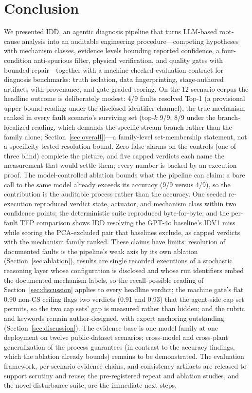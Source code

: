\documentclass[preprint,12pt]{elsarticle}
\begin{document}
\section{Conclusion}
\label{sec:conclusion}

We presented IDD, an agentic diagnosis pipeline that turns LLM-based root-cause analysis into an auditable engineering procedure---competing hypotheses with mechanism classes, evidence levels bounding reported confidence, a four-condition anti-spurious filter, physical verification, and quality gates with bounded repair---together with a machine-checked evaluation contract for diagnosis benchmarks: truth isolation, data fingerprinting, stage-authored artifacts with provenance, and gate-graded scoring. On the 12-scenario corpus the headline outcome is deliberately modest: 4/9 faults resolved Top-1 (a provisional upper-bound reading under the disclosed identifier channel), the true mechanism ranked in every fault scenario's surviving set (top-$k$ 9/9; 8/9 under the branch-localized reading, which demands the specific stream branch rather than the family alone; Section~\ref{sec:overall})---a family-level set-membership statement, not a specificity-tested resolution bound. Zero false alarms on the controls (one of three blind) complete the picture, and five capped verdicts each name the measurement that would settle them; every number is backed by an execution proof. The model-controlled ablation bounds what the pipeline can claim: a bare call to the same model already exceeds its accuracy (9/9 versus 4/9), so the contribution is the auditable process rather than the accuracy. One seeded re-execution reproduced verdict state, actuator, and mechanism class within two confidence points; the deterministic suite reproduced byte-for-byte; and the per-fault TEP comparison shows IDD resolving the GPT-4o baseline's IDV1 miss while scoring the PCA-excluded pair that baselines exclude, as capped verdicts with the mechanism family ranked.
These claims have limits: resolution of documented faults is the pipeline's weak axis by its own ablation (Section~\ref{sec:ablation}), results are single recorded executions of a stochastic reasoning layer whose configuration is disclosed and whose run identifiers embed the documented mechanism labels, so the recall-possible reading of Section~\ref{sec:discussion} applies to every headline verdict; the machine gate's flat 0.90 non-CS ceiling flags two verdicts (0.91 and 0.93) that the agent-side cap set permits, so the two cap sets' gap is measured rather than hidden; and the rubric and keywords remain author-designed, with expert anchoring outstanding (Section~\ref{sec:discussion}). The evidence base is one model family at one deployment on twelve public-dataset scenarios; cross-model and cross-plant generalization of the process guarantees (in contrast to the accuracy findings, which the ablation already bounds) remains to be demonstrated.
The evaluation framework, per-scenario evidence chains, and consistency artifacts are released to support scrutiny and reuse; the pre-registered repeat and ablation studies, and the novel-disturbance suite, are the immediate next steps.
\end{document}
